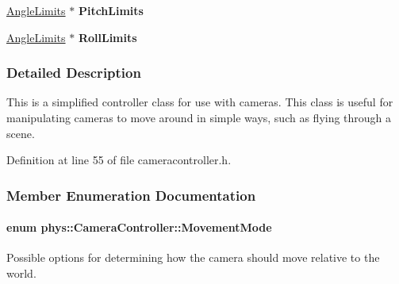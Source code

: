 \begin{DoxyCompactItemize}
\item 
\hypertarget{classphys_1_1CameraController_a4c6ea95a1099bf7494c2ee666b5f61a9}{
\hyperlink{structphys_1_1CameraController_1_1AngleLimits}{AngleLimits} $\ast$ {\bfseries PitchLimits}}
\label{de/d70/classphys_1_1CameraController_a4c6ea95a1099bf7494c2ee666b5f61a9}

\item 
\hypertarget{classphys_1_1CameraController_ad99abab0906a57263d3ca530194a125d}{
\hyperlink{structphys_1_1CameraController_1_1AngleLimits}{AngleLimits} $\ast$ {\bfseries RollLimits}}
\label{de/d70/classphys_1_1CameraController_ad99abab0906a57263d3ca530194a125d}

\end{DoxyCompactItemize}


\subsubsection{Detailed Description}
This is a simplified controller class for use with cameras. This class is useful for manipulating cameras to move around in simple ways, such as flying through a scene. 

Definition at line 55 of file cameracontroller.h.



\subsubsection{Member Enumeration Documentation}
\hypertarget{classphys_1_1CameraController_af7ea701f4b768a0335e8e0115d516af8}{
\paragraph[{MovementMode}]{\setlength{\rightskip}{0pt plus 5cm}enum {\bf phys::CameraController::MovementMode}}\hfill}
\label{de/d70/classphys_1_1CameraController_af7ea701f4b768a0335e8e0115d516af8}


Possible options for determining how the camera should move relative to the world. 

